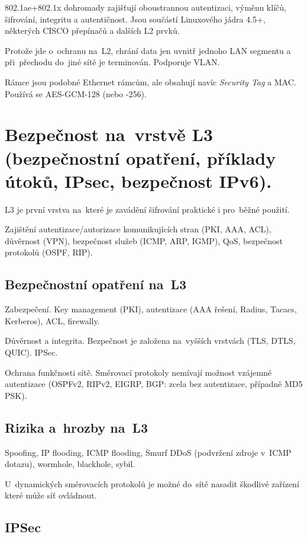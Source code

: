 802.1ae+802.1x dohromady zajišťují oboustrannou autentizaci, výměnu klíčů, šifrování, integritu a autentičnost.
Jsou součástí Linuxového jádra 4.5+, některých CISCO přepínačů a dalších L2 prvků.

Protože jde o~ochranu na~L2, chrání data jen uvnitř jednoho LAN segmentu a při~přechodu do~jiné sítě je terminován.
Podporuje VLAN.

Rámce jsou podobné Ethernet rámcům, ale obsahují navíc \emph{Security Tag} a MAC.
Používá se AES-GCM-128 (nebo -256).


\clearpage
\section{Bezpečnost na~vrstvě L3 (bezpečnostní opatření, příklady útoků, IPsec, bezpečnost IPv6).}

L3 je první vrstva na~které je zavádění šifrování praktické i pro~běžné použití.

Zajištění autentizace/autorizace komunikujících stran (PKI, AAA, ACL), důvěrnost (VPN), bezpečnost služeb (ICMP, ARP, IGMP), QoS, bezpečnost protokolů (OSPF, RIP).


\subsection{Bezpečnostní opatření na~L3}

Zabezpečení.
Key management (PKI), autentizace (AAA řešení, Radius, Tacacs, Kerberos), ACL, firewally.

Důvěrnost a integrita.
Bezpečnost je založena na~vyšších vrstvách (TLS, DTLS, QUIC).
IPSec.

Ochrana funkčnosti sítě.
Směrovací protokoly nemívají možnost vzájemné autentizace (OSPFv2, RIPv2, EIGRP, BGP: zcela bez autentizace, případně MD5 PSK).


\subsection{Rizika a~hrozby na~L3}

Spoofing, IP flooding, ICMP flooding, Smurf DDoS (podvržení zdroje v~ICMP dotazu), wormhole, blackhole, sybil.

U~dynamických směrovacích protokolů je možné do~sítě nasadit škodlivé zařízení které může síť ovládnout.


\subsection{IPSec}

